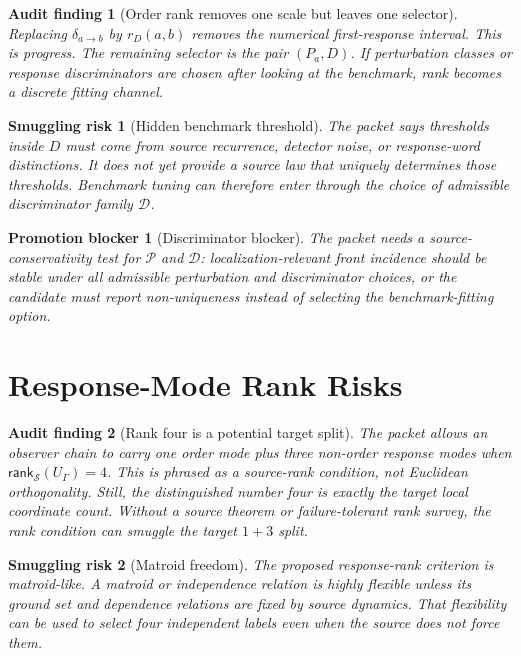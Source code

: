 \documentclass[11pt]{article}
\newcommand{\Rank}{\mathsf{rank}_{\mathcal{S}}}
\newtheorem{auditfinding}{Audit finding}
\newtheorem{smugglingrisk}{Smuggling risk}
\newtheorem{promotionblocker}{Promotion blocker}
\begin{document}
\begin{auditfinding}[Order rank removes one scale but leaves one selector]
Replacing \(\delta_{a\to b}\) by \(r_D(a,b)\) removes the numerical
first-response interval. This is progress. The remaining selector is the
pair \((P_a,D)\). If perturbation classes or response discriminators are
chosen after looking at the benchmark, rank becomes a discrete fitting
channel.
\end{auditfinding}

\begin{smugglingrisk}[Hidden benchmark threshold]
The packet says thresholds inside \(D\) must come from source recurrence,
detector noise, or response-word distinctions. It does not yet provide a
source law that uniquely determines those thresholds. Benchmark tuning can
therefore enter through the choice of admissible discriminator family
\(\mathcal{D}\).
\end{smugglingrisk}

\begin{promotionblocker}[Discriminator blocker]
The packet needs a source-conservativity test for \(\mathcal{P}\) and
\(\mathcal{D}\): localization-relevant front incidence should be stable under
all admissible perturbation and discriminator choices, or the candidate must
report non-uniqueness instead of selecting the benchmark-fitting option.
\end{promotionblocker}

\section{Response-Mode Rank Risks}

\begin{auditfinding}[Rank four is a potential target split]
The packet allows an observer chain to carry one order mode plus three
non-order response modes when \(\Rank(U_{\Gamma})=4\). This is phrased as a
source-rank condition, not Euclidean orthogonality. Still, the distinguished
number four is exactly the target local coordinate count. Without a source
theorem or failure-tolerant rank survey, the rank condition can smuggle the
target \(1+3\) split.
\end{auditfinding}

\begin{smugglingrisk}[Matroid freedom]
The proposed response-rank criterion is matroid-like. A matroid or independence
relation is highly flexible unless its ground set and dependence relations are
fixed by source dynamics. That flexibility can be used to select four
independent labels even when the source does not force them.
\end{smugglingrisk}
\end{document}
